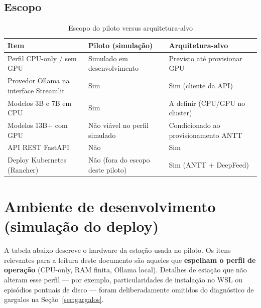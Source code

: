 \documentclass[12pt, a4paper]{article}
\begin{document}
\subsection{Escopo}

\begin{table}[H]
\centering
\small
\caption{Escopo do piloto versus arquitetura-alvo}
\label{tab:escopo_piloto}
\begin{tabularx}{\textwidth}{
  >{\raggedright\arraybackslash}X
  >{\raggedright\arraybackslash}p{3.6cm}
  >{\raggedright\arraybackslash}p{4.0cm}
}
\toprule
\textbf{Item} & \textbf{Piloto (simulação)} & \textbf{Arquitetura-alvo} \\
\midrule
Perfil CPU-only / sem GPU & Simulado em desenvolvimento & Previsto até provisionar GPU \\
Provedor Ollama na interface Streamlit & Sim & Sim (cliente da API) \\
Modelos 3B e 7B em CPU & Sim & A definir (CPU/GPU no cluster) \\
Modelos 13B+ com GPU & Não viável no perfil simulado & Condicionado ao provisionamento ANTT \\
API REST FastAPI & Não & Sim \\
Deploy Kubernetes (Rancher) & Não (fora do escopo deste piloto) & Sim (ANTT + DeepFeed) \\
\bottomrule
\end{tabularx}
\end{table}

\section{Ambiente de desenvolvimento (simulação do deploy)}

A tabela abaixo descreve o hardware da estação usada no piloto. Os itens relevantes para a leitura deste documento são aqueles que \textbf{espelham o perfil de operação} (CPU-only, RAM finita, Ollama local). Detalhes de estação que não alteram esse perfil --- por exemplo, particularidades de instalação no WSL ou episódios pontuais de disco --- foram deliberadamente omitidos do diagnóstico de gargalos na Seção~\ref{sec:gargalos}.
\end{document}
